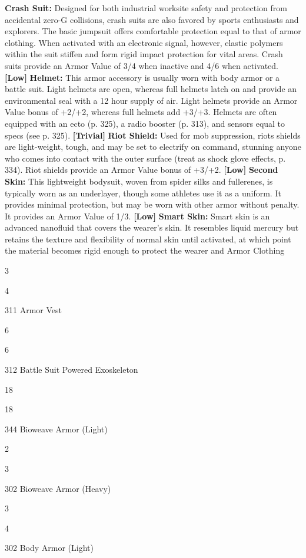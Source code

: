 \textbf{Crash Suit:} Designed for both industrial worksite 
safety and protection from accidental zero-G collisions, 
crash suits are also favored by sports enthusiasts and 
explorers. The basic jumpsuit offers comfortable protection
equal to that of armor clothing. When activated
with an electronic signal, however, elastic polymers
within the suit stiffen and form rigid impact protection 
for vital areas. Crash suits provide an Armor Value of 
3/4 when inactive and 4/6 when activated. \textbf{[Low]}
\textbf{Helmet:} This armor accessory is usually worn with 
body armor or a battle suit. Light helmets are open, 
whereas full helmets latch on and provide an environmental
seal with a 12 hour supply of air. Light helmets
provide an Armor Value bonus of +2/+2, whereas full 
helmets add +3/+3. Helmets are often equipped with 
an ecto (p. 325), a radio booster (p. 313), and sensors 
equal to specs (see p. 325). \textbf{[Trivial]}
\textbf{Riot Shield:} Used for mob suppression, riots shields 
are light-weight, tough, and may be set to electrify on 
command, stunning anyone who comes into contact 
with the outer surface (treat as shock glove effects, p. 
334). Riot shields provide an Armor Value bonus of 
+3/+2. \textbf{[Low]}
\textbf{Second Skin:} This lightweight bodysuit, woven 
from spider silks and fullerenes, is typically worn 
as an underlayer, though some athletes use it as a 
uniform. It provides minimal protection, but may be 
worn with other armor without penalty. It provides an 
Armor Value of 1/3. \textbf{[Low]}
\textbf{Smart Skin:} Smart skin is an advanced nanofluid
that covers the wearer's skin. It resembles liquid
mercury but retains the texture and flexibility  of 
normal skin until activated, at which point the material
becomes rigid enough to protect the wearer and
Armor Clothing 

3

4

311
Armor Vest 

6

6

312
Battle Suit Powered Exoskeleton 

18

18

344
Bioweave Armor (Light) 

2

3

302
Bioweave Armor (Heavy) 

3

4

302
Body Armor (Light) 

